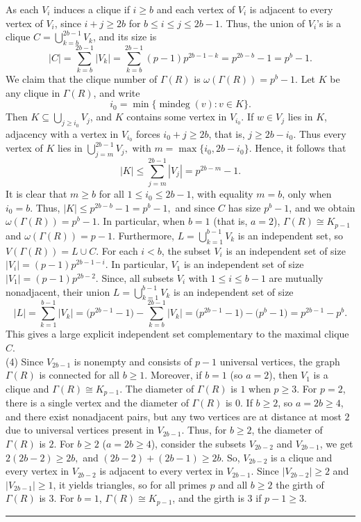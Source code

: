 \documentclass[12pt,twoside]{article}
\renewenvironment{proof}{{\noindent\bfseries Proof.}}{\qed}
\def\qed{\nolinebreak\hfill\rule{.2cm}{.2cm}\par\addvspace{.5cm}}
\begin{document}
\begin{proof}
		As each $V_{i}$ induces a clique if $i\geq b$ and each vertex of $V_{i}$ is adjacent to every vertex of $V_{i}$, since $i+j\geq 2b$ for $b\leq i\leq j\leq2b-1. $ Thus, the union of $V_{i}$'s is a clique $C = \bigcup_{k=b}^{2b-1} V_k$, and its size is
		\[
		|C|
		= \sum_{k=b}^{2b-1} |V_k|
		= \sum_{k=b}^{2b-1} (p-1)p^{ 2b-1-k}
		= p^{ 2b-b} - 1
		= p^{b} - 1.
		\]
		We claim that the clique number of $ \varGamma(R)$ is $\omega( \varGamma(R)) = p^b-1$. Let $K$ be any clique in $ \varGamma(R)$, and write
		\[
		i_0 = \min\{\operatorname{mindeg}(v) : v\in K\}.
		\]
		Then $K\subseteq \bigcup_{j\ge i_0} V_j$, and $K$ contains some vertex in $V_{i_0}$.
		If $w\in V_j$ lies in $K$, adjacency with a vertex in $V_{i_0}$ forces $i_0+j\ge 2b$, 	that is, $j\ge 2b-i_0$. Thus every vertex of $K$ lies in $\bigcup_{j=m}^{2b-1} V_j, $ with $ m = \max\{i_0,2b-i_0\}.$ Hence, it follows that
		\[
		|K|
		\le \sum_{j=m}^{2b-1} |V_j|
		= p^{ 2b-m}-1.
		\]
		It is clear that $m\ge b$ for all $1\le i_0\le 2b-1$, with equality $m=b$, only
		when $i_0=b$. Thus, $|K|\le p^{ 2b-b}-1 = p^b-1,$	and since $C$ has size $p^b-1$, and we obtain $\omega( \varGamma(R)) = p^b - 1.$ In particular, when $b=1$ (that is, $a=2$), $ \varGamma(R)\cong K_{p-1}$ and $\omega( \varGamma(R))=p-1$. Furthermore, $L=\bigcup_{k=1}^{b-1}V_k$ is an independent set, so $V( \varGamma(R)) = L \cup C$. For each $i<b$, the subset $V_i$ is an independent set of size	$|V_i| = (p-1)p^{ 2b-1-i}.$ In particular, $V_1$ is an independent set of size $|V_1|=(p-1)p^{ 2b-2}.$ Since, all subsets $V_i$ with $1\le i\le b-1$ are mutually nonadjacent, their union $L = \bigcup_{k=1}^{b-1} V_k$ is an independent set of size
		\[
		|L|
		= \sum_{k=1}^{b-1} |V_k|
		= \bigl(p^{ 2b-1}-1\bigr) - \sum_{k=b}^{2b-1} |V_k|
		= \bigl(p^{ 2b-1}-1\bigr) - \bigl(p^b-1\bigr)
		= p^{ 2b-1} - p^b.
		\]
		This gives a large explicit independent set complementary to the maximal clique $C$.\\
		(4) Since $V_{2b-1}$ is nonempty and consists of $p-1$ universal vertices, the graph $ \varGamma(R)$ is connected for all $b\ge1$. Moreover, if $b=1$ (so $a=2$), then $V_1$ is a clique and $ \varGamma(R)\cong K_{p-1}$. The diameter of $ \varGamma(R)$ is $1$ when $p\ge3$. For $p=2$, there is a single vertex and the diameter of $ \varGamma(R)$ is $0$.  If $b\ge 2$, so $a=2b\ge4$, and  there exist nonadjacent pairs, but any two vertices are at distance at most $2$ due to universal vertices present in $V_{2b-1}$. Thus, for $b\ge2$, the diameter of $ \varGamma(R)$ is $2$. For $b\ge 2$ ($a=2b\ge4$), consider the subsets $V_{2b-2}$ and $V_{2b-1}$, we get $2(2b-2)\ge 2b, $ and $ (2b-2)+(2b-1)\ge 2b$. So, $V_{2b-2}$ is a clique and every vertex in $V_{2b-2}$ is adjacent to every vertex in $V_{2b-1}$. Since $|V_{2b-2}|\ge 2$ and $|V_{2b-1}|\ge 1$, it yields triangles, so for all primes $p$ and all $b\ge2$ the girth of $ \varGamma(R)$ is $3$. For $b=1$, $ \varGamma(R)\cong K_{p-1}$, and the girth is $3$ if $p-1\ge3$.
	\end{proof}
	
\end{document}
